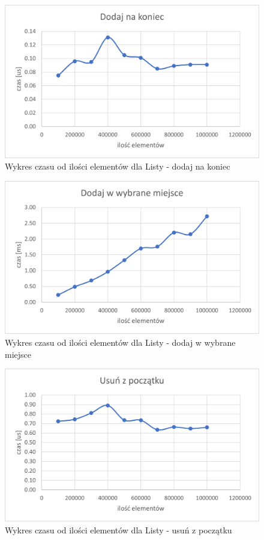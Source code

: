 \documentclass{article}
\begin{document}
    \begin{figure}[H]
        \centering
        \includegraphics[scale = 0.85]{wykresy/table/addLast.png}
        \caption{Wykres czasu od ilości elementów dla Listy - dodaj na koniec}
    \end{figure}

    \begin{figure}[H]
        \centering
        \includegraphics[scale = 0.85]{wykresy/table/addIndex.png}
        \caption{Wykres czasu od ilości elementów dla Listy - dodaj w wybrane miejsce}
    \end{figure}

    \begin{figure}[H]
        \centering
        \includegraphics[scale = 0.85]{wykresy/table/removeFirst.png}
        \caption{Wykres czasu od ilości elementów dla Listy - usuń z początku}
    \end{figure}
\end{document}
